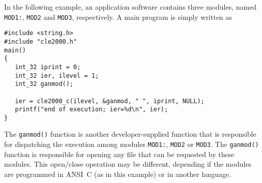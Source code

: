 \vskip 0.08cm

In the following example, an application software contains three modules, named {\tt MOD1:}, {\tt MOD2} and {\tt MOD3}, respectively.
A main program is simply written as

\begin{verbatim}
#include <string.h>
#include "cle2000.h"
main()
{
   int_32 iprint = 0;
   int_32 ier, ilevel = 1;
   int_32 ganmod();

   ier = cle2000_c(ilevel, &ganmod, " ", iprint, NULL);
   printf("end of execution; ier=%d\n", ier);
}
\end{verbatim}

The {\tt ganmod()} function is another developer-supplied function that is responsible for dispatching the execution among modules
{\tt MOD1:}, {\tt MOD2} or {\tt MOD3}. The {\tt ganmod()} function is responsible for opening any file that can be requested
by these modules. This open/close operation may be different, depending if the modules are programmed in ANSI~C (as in this example) or in another language.
